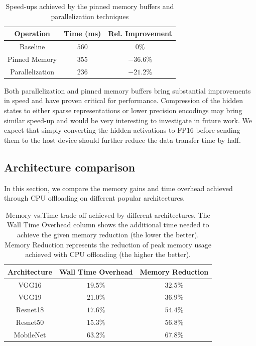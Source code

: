 \documentclass[11pt,onecolumn]{article}
\begin{document}
\begin{table}[h]
\begin{center}
\begin{tabular}{ c c c}	
\hline
Operation                   & Time (ms)  & Rel. Improvement\\
\hline
Baseline                    &  $560$    & $0\%$      \\
Pinned Memory               &  $355$    & $-36.6\%$ \\
Parallelization             &  $236$    & $-21.2\%$ \\
\hline
\end{tabular}
\caption{Speed-ups achieved by the pinned memory buffers and parallelization techniques}
\end{center}
\end{table}

Both parallelization and pinned memory buffers bring substantial improvements 
in speed and have proven critical for performance.
Compression of the hidden states to either sparse representations or lower precision
encodings may bring similar speed-up and would be very interesting to investigate in future work. 	
We expect that simply converting the hidden activations to FP16 before sending them
to the host device should further reduce the data transfer time by half.

\subsection{Architecture comparison}

In this section, we compare the memory gains and time overhead 
achieved through CPU offloading on different popular architectures.

\begin{table}[h]
\begin{center}
\begin{tabular}{ c c c}	
\hline
Architecture            & Wall Time Overhead & Memory Reduction    \\
\hline
VGG16                   &  $19.5\%$            & $32.5\%$          \\
VGG19                   &  $21.0\%$            & $36.9\%$          \\
Resnet18       	        &  $17.6\%$            & $54.4\%$          \\
Resnet50                &  $15.3\%$            & $56.8\%$          \\
MobileNet               &  $63.2\%$            & $67.8\%$          \\
\hline
\end{tabular}
\caption{Memory vs.Time trade-off achieved by different architectures.
The Wall Time Overhead column shows the additional time needed to achieve the given memory reduction (the lower the better).
Memory Reduction represents the reduction of peak memory usage achieved with CPU offloading (the higher the better).}
\end{center}
\end{table}
\end{document}
